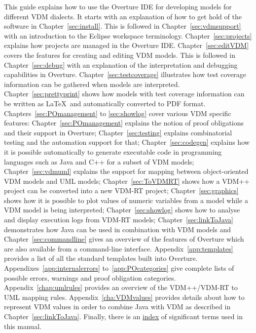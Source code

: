 \documentclass{overturerepchap}
\begin{document}
This guide explains how to use the Overture IDE for developing models
for different VDM dialects. It starts with an explanation
of how to get hold of the software in
Chapter~\ref{sec:install}. This is followed in
Chapter~\ref{sec:vdmsupport} with an introduction to the Eclipse
workspace terminology. Chapter~\ref{sec:projects} explains how
projects are managed in the Overture IDE. Chapter~\ref{sec:editVDM}
covers the features for creating and editing VDM models. This is
followed in Chapter~\ref{sec:debug} with an explanation of the
interpretation and debugging capabilities in Overture.
Chapter~\ref{sec:testcoverage} illustrates how test coverage
information can be gathered when models are interpreted.
Chapter~\ref{sec:prettyprint} shows how models with test
coverage information can be written as
\LaTeX\ and automatically converted to PDF format.
Chapters~\ref{sec:POmanagement} to \ref{sec:showlog} cover various
VDM specific features: Chapter~\ref{sec:POmanagement}
explains the notion of proof obligations and their support in
Overture; Chapter~\ref{sec:testing} explains
combinatorial testing and the automation support for that; Chapter~\ref{sec:codegen} explains
how it is possible automatically to generate executable code in programming languages such as Java and C++ for a subset of VDM models;
Chapter~\ref{sec:vdmuml} explains the support for mapping between
object-oriented VDM models and UML models; Chapter~\ref{sec:ToVDMRT}
shows how a VDM++ project can be
converted into a new VDM-RT project; Chapter~\ref{sec:graphics} shows how it is possible to plot values of numeric variables from a model while a VDM model is being interpreted; Chapter~\ref{sec:showlog} shows
how to analyse and display execution logs from VDM-RT models; 
Chapter~\ref{sec:linkToJava} demonstrates how Java can be used in 
combination with VDM models and
Chapter~\ref{sec:commandline} gives an
overview of the features of Overture which are also available from
a command-line interface. Appendix~\ref{app:templates} provides a list
of all the standard templates built into Overture.
Appendixes~\ref{app:internalerrors}
to~\ref{app:POcategories} give complete lists of possible errors,
warnings and proof obligation categories. Appendix~\ref{chap:umlrules} provides
an overview of the VDM++/VDM-RT to UML mapping rules. 
Appendix~\ref{cha:VDMvalues} provides details about how to represent VDM 
values in order to combine Java with VDM as described in Chapter~\ref{sec:linkToJava}.
Finally, there is an \hyperref[sec:index]{index} of significant terms used in this
manual.
\end{document}
